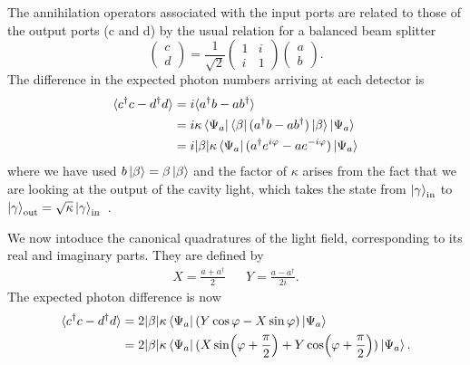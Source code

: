 The annihilation operators associated with the input ports are related to those
of the output ports (c and d) by the usual relation for a balanced beam
splitter~\cite{agarwal2012}
%
\begin{equation}
  \label{squeeze:eqn:bsmat}
  \begin{pmatrix} c \\ d \end{pmatrix} = \frac{1}{\sqrt{2}}\begin{pmatrix}
    1 & i \\ i & 1 
  \end{pmatrix}  \begin{pmatrix} a \\ b \end{pmatrix}.
\end{equation}
%
The difference in the expected photon numbers arriving at each
detector is
%
\begin{align}
  \langle c^\dagger c - d^\dagger d\rangle &= i\langle a^\dagger b- ab^\dagger
  \rangle \\
  &= i \kappa \bra{\Psi_a}\bra{\beta}(a^\dagger b-
  ab^\dagger)\ket{\beta}\ket{\Psi_a} \\
  & = i|\beta|\kappa \bra{\Psi_a}(a^\dagger e^{i\varphi} - a
  e^{-i\varphi})\ket{\Psi_a} \\
\end{align}
%
where we have used $b\ket{\beta} = \beta\ket{\beta}$ and the factor of $\kappa$
arises from the fact that we are looking at the output of the cavity light,
which takes the state from $\ket{\gamma}_\text{in}$ to $\ket{\gamma}_\text{out}
= \sqrt{\kappa}\ket{\gamma}_\text{in}$~\cite{Vanner16182}.

We now intoduce the canonical quadratures of the light field, corresponding to
its real and imaginary parts. They are defined by~\cite{gerry_knight_2004}
%
\begin{align}
  X = \frac{a + a^\dagger}{2} && Y = \frac{a - a^\dagger}{2i}.
\end{align}
%
The expected photon difference is now
\begin{align}
  \langle c^\dagger c - d^\dagger d\rangle &=
  2|\beta|\kappa\bra{\Psi_a}(Y\cos\varphi - X\sin\varphi)\ket{\Psi_a} \\
  &= 2|\beta|\kappa\bra{\Psi_a}(X\sin(\varphi+\frac{\pi}{2}) +
  Y\cos(\varphi+\frac{\pi}{2}))\ket{\Psi_a}.
  \label{squeeze:eqn:homoquads}
\end{align}

